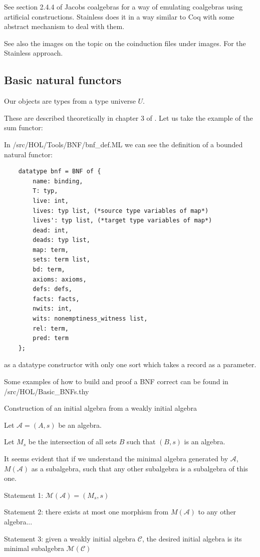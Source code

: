 See section 2.4.4 of Jacobs coalgebras for a way of emulating coalgebras using artificial constructions. Stainless does it in a way similar to Coq with some abstract mechanism to deal with them.  

See also the images on the topic on the coinduction files under images. For the Stainless approach. 


\subsection{Basic natural functors}

Our objects are types from a type universe $U$. 

These are described theoretically in chapter 3 of \cite{traytel}. Let us take the example of the sum functor:



In /src/HOL/Tools/BNF/bnf\_def.ML we can see the definition of a bounded natural functor:

\begin{lstlisting}
	datatype bnf = BNF of {
		name: binding,
		T: typ,
		live: int,
		lives: typ list, (*source type variables of map*)
		lives': typ list, (*target type variables of map*)
		dead: int,
		deads: typ list,
		map: term,
		sets: term list,
		bd: term,
		axioms: axioms,
		defs: defs,
		facts: facts,
		nwits: int,
		wits: nonemptiness_witness list,
		rel: term,
		pred: term
	};
\end{lstlisting}

as a datatype constructor with only one sort which takes a record as a parameter. 

Some examples of how to build and proof a BNF correct can be found in /src/HOL/Basic\_BNFs.thy


Construction of an initial algebra from a weakly initial algebra

Let $\mathcal{A} = (A,s)$ be an algebra.

Let $M_s$ be the intersection of all sets $B$ such that $(B,s)$ is an algebra.

It seems evident that if we understand the minimal algebra generated by $\mathcal{A}$, $M(\mathcal{A})$ as a subalgebra, such that any other subalgebra is a subalgebra of this one.

Statement 1: $\mathcal{M}(\mathcal{A}) = (M_s,s)$

Statement 2: there exists at most one morphism from $M(\mathcal{A})$ to any other algebra...

Statement 3: given a weakly initial algebra $\mathcal{C}$, the desired initial algebra is its minimal subalgebra $\mathcal{M}(\mathcal{C})$ 